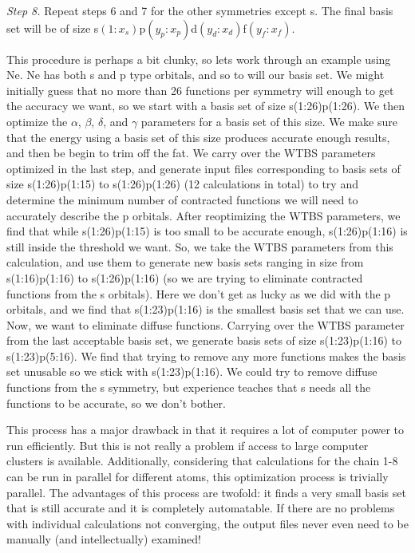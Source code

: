 \documentclass[12pt]{report}
\begin{document}
\textit{Step 8.} Repeat steps 6 and 7 for the other symmetries except s. The final basis set will be of size s$(1:x_{s})$p$(y_{p}:x_{p})$d$(y_{d}:x_{d})$f$(y_{f}:x_{f})$.

This procedure is perhaps a bit clunky, so lets work through an example using Ne. Ne has both s and p type orbitals, and so to will our basis set. We might initially guess that no more than 26 functions per symmetry will enough to get the accuracy we want, so we start with a basis set of size s(1:26)p(1:26). We then optimize the $\alpha$, $\beta$, $\delta$, and $\gamma$ parameters for a basis set of this size. We make sure that the energy using a basis set of this size produces accurate enough results, and then be begin to trim off the fat. We carry over the WTBS parameters optimized in the last step, and generate input files corresponding to basis sets of size s(1:26)p(1:15) to s(1:26)p(1:26) (12 calculations in total) to try and determine the minimum number of contracted functions we will need to accurately describe the p orbitals. After reoptimizing the WTBS parameters, we find that while s(1:26)p(1:15) is too small to be accurate enough, s(1:26)p(1:16) is still inside the threshold we want. So, we take the WTBS parameters from this calculation, and use them to generate new basis sets ranging in size from s(1:16)p(1:16) to s(1:26)p(1:16) (so we are trying to eliminate contracted functions from the s orbitals). Here we don't get as lucky as we did with the p orbitals, and we find that s(1:23)p(1:16) is the smallest basis set that we can use. Now, we want to eliminate diffuse functions. Carrying over the WTBS parameter from the last acceptable basis set, we generate basis sets of size s(1:23)p(1:16) to s(1:23)p(5:16). We find that trying to remove any more functions makes the basis set unusable so we stick with s(1:23)p(1:16). We could try to remove diffuse functions from the s symmetry, but experience teaches that s needs all the functions to be accurate, so we don't bother.

This process has a major drawback in that it requires a lot of computer power to run efficiently. But this is not really a problem if access to large computer clusters is available. Additionally, considering that calculations for the chain 1-8 can be run in parallel for different atoms, this optimization process is trivially parallel. The advantages of this process are twofold: it finds a very small basis set that is still accurate and it is completely automatable. If there are no problems with individual calculations not converging, the output files never even need to be manually (and intellectually) examined!
\end{document}
